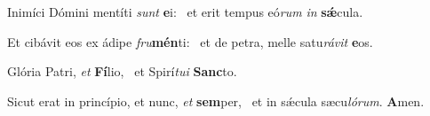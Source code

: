 \item Inimíci Dómini mentíti \textit{sunt} \textbf{e}i:~\psstar{} et erit tempus eó\textit{rum} \textit{in} \textbf{sǽ}cula.

\item Et cibávit eos ex ádipe \textit{fru}\textbf{mén}ti:~\psstar{} et de petra, melle satu\textit{rávit} \textbf{e}os.

\item Glória Patri, \textit{et} \textbf{Fí}lio,~\psstar{} et Spirí\textit{tui} \textbf{Sanc}to.

\item Sicut erat in princípio, et nunc, \textit{et} \textbf{sem}per,~\psstar{} et in sǽcula sæcu\textit{lórum}. \textbf{A}men.
